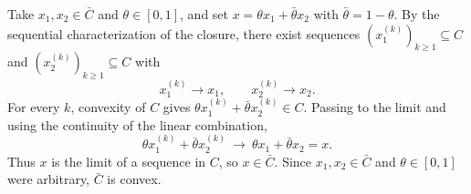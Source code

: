 \documentclass[UTF8,a4paper,12pt]{ctexart}
\begin{document}
Take $x_1,x_2\in\bar C$ and $\theta\in[0,1]$, and set
$x=\theta x_1+\bar\theta x_2$ with $\bar\theta=1-\theta$. By the sequential
characterization of the closure, there exist sequences
$(x_1^{(k)})_{k\ge1}\subseteq C$ and $(x_2^{(k)})_{k\ge1}\subseteq C$ with
\[
x_1^{(k)}\to x_1,\qquad x_2^{(k)}\to x_2 .
\]
For every $k$, convexity of $C$ gives
$\theta x_1^{(k)}+\bar\theta x_2^{(k)}\in C$. Passing to the limit and using the
continuity of the linear combination,
\[
\theta x_1^{(k)}+\bar\theta x_2^{(k)}
\ \longrightarrow\
\theta x_1+\bar\theta x_2=x .
\]
Thus $x$ is the limit of a sequence in $C$, so $x\in\bar C$. Since $x_1,x_2\in
\bar C$ and $\theta\in[0,1]$ were arbitrary, $\bar C$ is convex.
\end{document}

